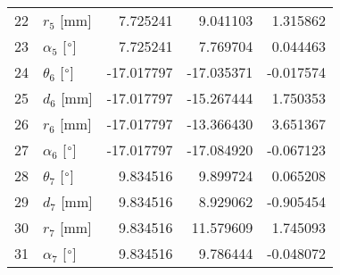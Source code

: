 \documentclass{standalone}%
\begin{document}
\begin{tabular}{llrrr}
22 &              $r_{5}$ [mm] &   7.725241 &   9.041103 &   1.315862 \\
23 &  $\alpha_{5}$ [$\degree$] &   7.725241 &   7.769704 &   0.044463 \\
24 &  $\theta_{6}$ [$\degree$] & -17.017797 & -17.035371 &  -0.017574 \\
25 &              $d_{6}$ [mm] & -17.017797 & -15.267444 &   1.750353 \\
26 &              $r_{6}$ [mm] & -17.017797 & -13.366430 &   3.651367 \\
27 &  $\alpha_{6}$ [$\degree$] & -17.017797 & -17.084920 &  -0.067123 \\
28 &  $\theta_{7}$ [$\degree$] &   9.834516 &   9.899724 &   0.065208 \\
29 &              $d_{7}$ [mm] &   9.834516 &   8.929062 &  -0.905454 \\
30 &              $r_{7}$ [mm] &   9.834516 &  11.579609 &   1.745093 \\
31 &  $\alpha_{7}$ [$\degree$] &   9.834516 &   9.786444 &  -0.048072 \\
\bottomrule
\end{tabular}
%
\end{document}
